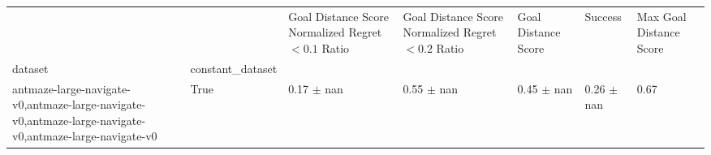 \begin{tabular}{lllllll}
\toprule
 &  & Goal Distance Score Normalized Regret $< 0.1$ Ratio & Goal Distance Score Normalized Regret $< 0.2$ Ratio & Goal Distance Score & Success & Max Goal Distance Score \\
dataset & constant_dataset &  &  &  &  &  \\
\midrule
antmaze-large-navigate-v0,antmaze-large-navigate-v0,antmaze-large-navigate-v0,antmaze-large-navigate-v0 & True & 0.17 $\pm$ nan & 0.55 $\pm$ nan & 0.45 $\pm$ nan & 0.26 $\pm$ nan & 0.67 \\
\cline{1-7}
\bottomrule
\end{tabular}
